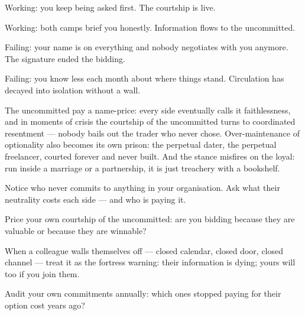 \begin{feedback}
  \item Working: you keep being asked first. The courtship is live.
  \item Working: both camps brief you honestly. Information flows to the uncommitted.
  \item Failing: your name is on everything and nobody negotiates with you anymore. The signature ended the bidding.
  \item Failing: you know less each month about where things stand. Circulation has decayed into isolation without a wall.
\end{feedback}
\begin{failure}
The uncommitted pay a name-price: every side eventually calls it faithlessness, and in moments of crisis the courtship of the uncommitted turns to coordinated resentment --- nobody bails out the trader who never chose. Over-maintenance of optionality also becomes its own prison: the perpetual dater, the perpetual freelancer, courted forever and never built. And the stance misfires on the loyal: run inside a marriage or a partnership, it is just treachery with a bookshelf.
\end{failure}
\begin{countermeasures}
  \item Notice who never commits to anything in your organisation. Ask what their neutrality costs each side --- and who is paying it.
  \item Price your own courtship of the uncommitted: are you bidding because they are valuable or because they are winnable?
  \item When a colleague walls themselves off --- closed calendar, closed door, closed channel --- treat it as the fortress warning: their information is dying; yours will too if you join them.
  \item Audit your own commitments annually: which ones stopped paying for their option cost years ago?
\end{countermeasures}

\seesources
{}
